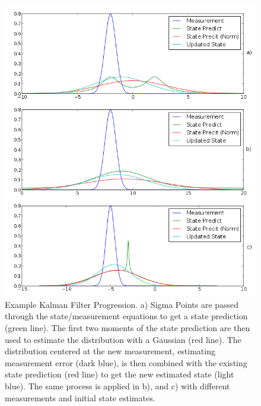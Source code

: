 \begin{figure}
\includegraphics[width=16cm]{images/kalman2}
\caption[Example Kalman Filter Progression]
{Example Kalman Filter Progression. a) Sigma Points are passed through the state/measurement equations
to get a state prediction (green line). The first two moments of
the state prediction are then used to estimate the distribution with
a Gaussian (red line). The distribution centered at the new measurement,
estimating measurement error (dark blue), is then combined with the existing
state prediction (red line) to get the new estimated state (light blue).
The same process is applied in b), and c) with different measurements and
initial state estimates.}
\label{fig:EKFWorking}
\end{figure}

